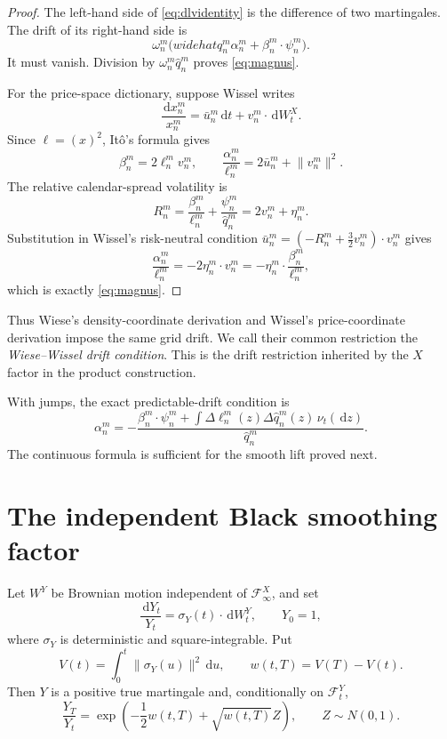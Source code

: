 \documentclass[11pt,a4paper]{article}
\newcommand{\F}{\mathcal F}
\newcommand{\dd}{\,\mathrm d}
\begin{document}
\begin{proof}
The left-hand side of \eqref{eq:dlvidentity} is the difference of two
martingales.  The drift of its right-hand side is
\[
 \omega_n^m\bigl(widehat q_n^m\alpha_n^m
                 +\beta_n^m\cdot\psi_n^m\bigr).
\]
It must vanish.  Division by $\omega_n^m\widehat q_n^m$ proves
\eqref{eq:magnus}.

For the price-space dictionary, suppose Wissel writes
\[
 \frac{\dd x_n^m}{x_n^m}
 =\bar u_n^m\dd t+v_n^m\cdot\dd W_t^X .
\]
Since $\ell=(x)^2$, It\^o's formula gives
\[
 \beta_n^m=2\ell_n^mv_n^m,
 \qquad
 \frac{\alpha_n^m}{\ell_n^m}
 =2\bar u_n^m+\lVert v_n^m\rVert^2.
\]
The relative calendar-spread volatility is
\[
 R_n^m=\frac{\beta_n^m}{\ell_n^m}
       +\frac{\psi_n^m}{\widehat q_n^m}
       =2v_n^m+\eta_n^m.
\]
Substitution in Wissel's risk-neutral condition
$\bar u_n^m=(-R_n^m+\tfrac32v_n^m)\cdot v_n^m$ gives
\[
 \frac{\alpha_n^m}{\ell_n^m}
 =-2\eta_n^m\cdot v_n^m
 =-\eta_n^m\cdot\frac{\beta_n^m}{\ell_n^m},
\]
which is exactly \eqref{eq:magnus}.
\end{proof}

Thus Wiese's density-coordinate derivation and Wissel's price-coordinate
derivation impose the same grid drift.  We call their common restriction the
\emph{Wiese--Wissel drift condition}.  This is the drift restriction inherited
by the $X$ factor in the product construction.

With jumps, the exact predictable-drift condition is
\begin{equation}
 \alpha_n^m=-\frac{\beta_n^m\cdot\psi_n^m
 +\displaystyle\int\Delta\ell_n^m(z)\Delta\widehat q_n^m(z)\,
                    \nu_t(\dd z)}{\widehat q_n^m}.
 \label{eq:magnusjump}
\end{equation}
The continuous formula is sufficient for the smooth lift proved next.

\section{The independent Black smoothing factor}

Let $W^Y$ be Brownian motion independent of $\F^X_\infty$, and set
\begin{equation}
 \frac{\dd Y_t}{Y_t}=\sigma_Y(t)\cdot\dd W_t^Y,
 \qquad
 Y_0=1,
 \label{eq:Y}
\end{equation}
where $\sigma_Y$ is deterministic and square-integrable.  Put
\begin{equation}
 V(t)=\int_0^t\lVert\sigma_Y(u)\rVert^2\dd u,
 \qquad
 w(t,T)=V(T)-V(t).
 \label{eq:clock}
\end{equation}
Then $Y$ is a positive true martingale and, conditionally on $\F_t^Y$,
\[
 \frac{Y_T}{Y_t}
 =\exp\!\left(-\frac12w(t,T)+\sqrt{w(t,T)}Z\right),
 \qquad Z\sim N(0,1).
\]
\end{document}
